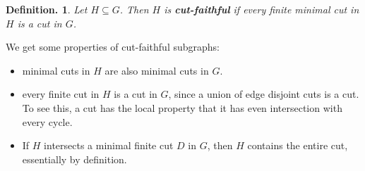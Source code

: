 \documentclass[11pt, a4paper]{memoir}
\theoremstyle{change}
\theoremstyle{plain}
\theoremstyle{nonumberplain}
\newtheorem{definition}{Definition.}
\numberwithin{equation}{section}
\begin{document}
\begin{definition}
    Let $H\subseteq G$.
    Then $H$ is \textbf{cut-faithful} if every finite minimal cut in $H$ is a cut in $G$.
\end{definition}
We get some properties of cut-faithful subgraphs:
\begin{itemize}[nl]
    \item minimal cuts in $H$ are also minimal cuts in $G$.
    \item every finite cut in $H$ is a cut in $G$, since a union of edge disjoint cuts is a cut.
        To see this, a cut has the local property that it has even intersection with every cycle.
    \item If $H$ intersects a minimal finite cut $D$ in $G$, then $H$ contains the entire cut, essentially by definition.
\end{itemize}
\end{document}

